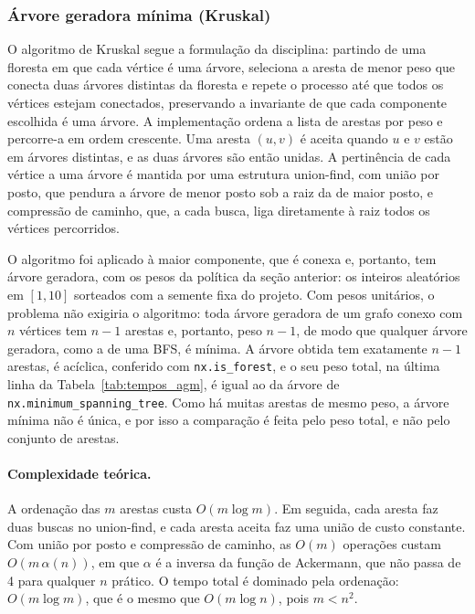 \subsubsection{Árvore geradora mínima (Kruskal)}

O algoritmo de Kruskal segue a formulação da disciplina: partindo de uma floresta em que cada vértice é uma árvore, seleciona a aresta de menor peso que conecta duas árvores distintas da floresta e repete o processo até que todos os vértices estejam conectados, preservando a invariante de que cada componente escolhida é uma árvore. A implementação ordena a lista de arestas por peso e percorre-a em ordem crescente. Uma aresta $(u, v)$ é aceita quando $u$ e $v$ estão em árvores distintas, e as duas árvores são então unidas. A pertinência de cada vértice a uma árvore é mantida por uma estrutura union-find, com união por posto, que pendura a árvore de menor posto sob a raiz da de maior posto, e compressão de caminho, que, a cada busca, liga diretamente à raiz todos os vértices percorridos.

O algoritmo foi aplicado à maior componente, que é conexa e, portanto, tem árvore geradora, com os pesos da política da seção anterior: os inteiros aleatórios em $[1, 10]$ sorteados com a semente fixa do projeto. Com pesos unitários, o problema não exigiria o algoritmo: toda árvore geradora de um grafo conexo com $n$ vértices tem $n - 1$ arestas e, portanto, peso $n - 1$, de modo que qualquer árvore geradora, como a de uma BFS, é mínima. A árvore obtida tem exatamente $n - 1$ arestas, é acíclica, conferido com \texttt{nx.is\_forest}, e o seu peso total, na última linha da Tabela~\ref{tab:tempos_agm}, é igual ao da árvore de \texttt{nx.minimum\_spanning\_tree}. Como há muitas arestas de mesmo peso, a árvore mínima não é única, e por isso a comparação é feita pelo peso total, e não pelo conjunto de arestas.

\paragraph{Complexidade teórica.} A ordenação das $m$ arestas custa $O(m \log m)$. Em seguida, cada aresta faz duas buscas no union-find, e cada aresta aceita faz uma união de custo constante. Com união por posto e compressão de caminho, as $O(m)$ operações custam $O(m \, \alpha(n))$, em que $\alpha$ é a inversa da função de Ackermann, que não passa de 4 para qualquer $n$ prático. O tempo total é dominado pela ordenação: $O(m \log m)$, que é o mesmo que $O(m \log n)$, pois $m < n^2$.

